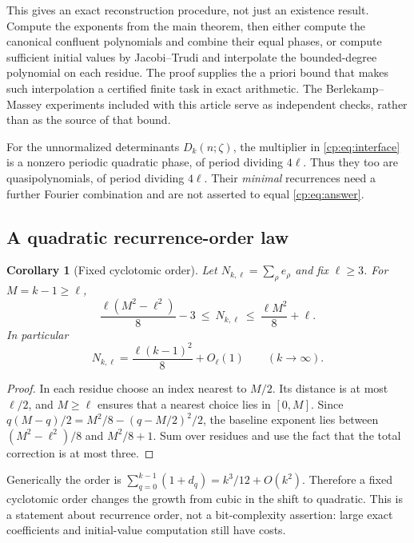 \documentclass[11pt]{article}
\newtheorem{corollary}[theorem]{Corollary}
\theoremstyle{definition}
\theoremstyle{remark}
\theoremstyle{definition}
\theoremstyle{plain}
\numberwithin{equation}{section}
\begin{document}
This gives an exact reconstruction procedure, not just an existence result.
Compute the exponents from the main theorem, then either compute the
canonical confluent polynomials and combine their equal phases, or compute
sufficient initial values by Jacobi--Trudi and interpolate the bounded-degree
polynomial on each residue. The proof supplies the a priori bound that makes
such interpolation a certified finite task in exact arithmetic. The
Berlekamp--Massey experiments included with this article serve as independent
checks, rather than as the source of that bound.

For the unnormalized determinants $D_k(n;\zeta)$, the multiplier in
\eqref{cp:eq:interface} is a nonzero periodic quadratic phase, of period
dividing $4\ell$. Thus they too are quasipolynomials, of period dividing
$4\ell$. Their \emph{minimal} recurrences need a further Fourier
combination and are not asserted to equal \eqref{cp:eq:answer}.

\subsection{A quadratic recurrence-order law}
\begin{corollary}[Fixed cyclotomic order]
\label{cp:cor:order}
Let $N_{k,\ell}=\sum_\rho e_\rho$ and fix $\ell\ge3$.
For $M=k-1\ge\ell$,
\begin{equation}
 \frac{\ell(M^2-\ell^2)}8-3
 \ \le\ N_{k,\ell}\ \le\ \frac{\ell M^2}8+\ell.
 \label{cp:eq:orderbounds}
\end{equation}
In particular
\begin{equation}
 N_{k,\ell}=\frac{\ell(k-1)^2}{8}+O_\ell(1)
 \qquad(k\to\infty).
 \label{cp:eq:orderasymptotic}
\end{equation}
\end{corollary}
\begin{proof}
In each residue choose an index nearest to $M/2$. Its distance is at most
$\ell/2$, and $M\ge\ell$ ensures that a nearest choice lies in $[0,M]$.
Since $q(M-q)/2=M^2/8-(q-M/2)^2/2$, the baseline exponent lies between
$(M^2-\ell^2)/8$ and $M^2/8+1$. Sum over residues and use the fact that
the total correction is at most three.
\end{proof}
Generically the order is
$\sum_{q=0}^{k-1}(1+d_q)=k^3/12+O(k^2)$. Therefore a fixed
cyclotomic order changes the growth from cubic in the shift to quadratic.
This is a statement about recurrence order, not a bit-complexity assertion:
large exact coefficients and initial-value computation still have costs.
\end{document}
